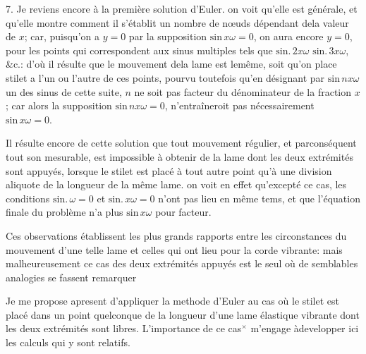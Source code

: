\documentclass[11pt,a4paper]{article}
\begin{document}
7. Je reviens encore à la première solution d'Euler. on voit qu'elle est générale,
et qu'elle montre comment il s'établit un nombre de nœuds dépendant dela
valeur de $x$; car, puisqu'on a $y = 0$ par la supposition $\text{sin}\,x\omega = 0$, on aura
encore $y = 0$, pour les points qui correspondent aux sinus multiples tels que
$\text{sin.}\,2x\omega$ $\text{sin.}\,3x\omega$, \&c.: d'où il résulte que le mouvement dela lame est lemême,
soit qu'on place  stilet  a l'un ou l'autre de ces points, pourvu toutefois
qu'en désignant par $\text{sin}\,nx\omega$ un des sinus de cette suite, $n$ ne soit pas facteur du
dénominateur de la fraction $x$; car alors la supposition $\text{sin}\,nx\omega = 0$, n'entraîneroit pas nécessairement $\text{sin}\,x\omega = 0$.


Il résulte encore de cette solution que tout mouvement régulier, et parconséquent
tout son mesurable, est impossible à obtenir de la lame dont les deux extrémités
sont appuyés, lorsque le stilet est placé à tout autre point qu'à une division
aliquote de la longueur de la même lame. on voit en effet qu'excepté
ce cas, les conditions $\text{sin.}\,\omega = 0$ et $\text{sin.}\,x\omega = 0$ n'ont pas lieu en même tems,
et que l'équation finale du problème n'a plus $\text{sin}\,x\omega$ pour facteur.

Ces observations établissent les plus grands rapports entre les circonstances
du mouvement d'une telle lame et celles qui ont lieu pour la corde vibrante:
mais malheureusement ce cas des deux extrémités appuyés est le seul où de
semblables analogies se fassent remarquer

Je me propose apresent d'appliquer la methode d'Euler au cas où le stilet
est placé dans un point quelconque de la longueur d'une lame élastique
vibrante dont les deux extrémités sont libres. L'importance de ce cas$^{\times}$ m'engage
àdevelopper ici les calculs qui y sont relatifs.
\end{document}
